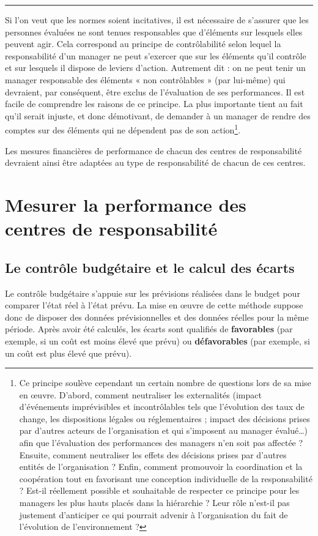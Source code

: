 \documentclass[oneside]{kaobook}
\begin{document}
\noindent\rule{\textwidth}{0.5pt}

Si l’on veut que les normes soient incitatives, il est nécessaire de s’assurer que les personnes évaluées ne sont tenues responsables que d’éléments sur lesquels elles peuvent agir. Cela correspond au principe de contrôlabilité selon lequel la responsabilité d’un manager ne peut s’exercer que sur les éléments qu’il contrôle et sur lesquels il dispose de leviers d’action. Autrement dit : on ne peut tenir un manager responsable des éléments « non contrôlables » (par lui-même) qui devraient, par conséquent, être exclus de l’évaluation de ses performances. Il est facile de comprendre les raisons de ce principe. La plus importante tient au fait qu’il serait injuste, et donc démotivant, de demander à un manager de rendre des comptes sur des éléments qui ne dépendent pas de son action\footnote{Ce principe soulève cependant un certain nombre de questions lors de sa mise en œuvre. D'abord, comment neutraliser les externalités (impact d’événements imprévisibles et incontrôlables tels que l’évolution des taux de change, les dispositions légales ou réglementaires ; impact des décisions prises par d’autres acteurs de l’organisation et qui s’imposent au manager évalué…) afin que l’évaluation des performances des managers n’en soit pas affectée ? Ensuite, comment neutraliser les effets des décisions prises par d’autres entités de l’organisation ? Enfin, comment promouvoir la coordination et la coopération tout en favorisant une conception individuelle de la responsabilité ? Est-il réellement possible et souhaitable de respecter ce principe pour les managers les plus hauts placés dans la hiérarchie ? Leur rôle n’est-il pas justement d’anticiper ce qui pourrait advenir à l’organisation du fait de l’évolution de l’environnement ?}.

Les mesures financières de performance de chacun des centres de responsabilité devraient ainsi être adaptées au type de responsabilité de chacun de ces centres.
\section{Mesurer la performance des centres de responsabilité}
\label{sec:org345f9dc}
\subsection{Le contrôle budgétaire et le calcul des écarts}
\label{sec:orgee8d285}
Le contrôle budgétaire s’appuie sur les prévisions réalisées dans le budget pour comparer l’état réel à l’état prévu. La mise en œuvre de cette méthode suppose donc de disposer des données prévisionnelles et des données réelles pour la même période.
Après avoir été calculés, les écarts sont qualifiés de \textbf{favorables} (par exemple, si un coût est moins élevé que prévu) ou \textbf{défavorables} (par exemple, si un coût est plus élevé que prévu).
\end{document}
